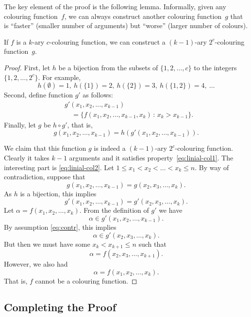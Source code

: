 The key element of the proof is the following lemma. Informally, given any colouring function~$f$, we can always construct another colouring function~$g$ that is ``faster'' (smaller number of arguments) but ``worse'' (larger number of colours).

\begin{lemma}\label{lem:linial-iter}
    If $f$ is a $k$-ary $c$-colouring function, we can construct a $(k-1)$-ary $2^c$-colouring function~$g$.
\end{lemma}
\begin{proof}
    First, let $h$ be a bijection from the subsets of $\{1,2,\dotsc,c\}$ to the integers $\{1,2,\dotsc,2^c\}$. For example,
    \[
        h(\emptyset) = 1,\ h(\{1\}) = 2,\ h(\{2\}) = 3,\ h(\{1,2\}) = 4,\ \dotsc
    \]
    Second, define function $g'$ as follows:
    \[
    \begin{split}
        &g'(x_1, x_2, \dotsc, x_{k-1}) \\
        &\quad= \bigl\{ f(x_1, x_2, \dotsc, x_{k-1}, x_k) \,:\, x_k > x_{k-1} \bigr\}.
    \end{split}
    \]
    Finally, let $g$ be $h \circ g'$, that is,
    \[
        g(x_1, x_2, \dotsc, x_{k-1}) = h(g'(x_1, x_2, \dotsc, x_{k-1})).
    \]

    We claim that this function $g$ is indeed a $(k-1)$-ary $2^c$-colouring function. Clearly it takes $k-1$ arguments and it satisfies property~\eqref{eq:linial-col1}. The interesting part is \eqref{eq:linial-col2}. Let $1 \le x_1 < x_2 < \dotso < x_k \le n$. By way of contradiction, suppose that
    \[
        g(x_1, x_2, \dotsc, x_{k-1}) = g(x_2, x_3, \dotsc, x_k).
    \]
    As $h$ is a bijection, this implies
    \begin{equation}
        g'(x_1, x_2, \dotsc, x_{k-1}) = g'(x_2, x_3, \dotsc, x_k). \label{eq:contr}
    \end{equation}
    Let $\alpha = f(x_1, x_2, \dotsc, x_k)$.
    From the definition of $g'$ we have
    \[
        \alpha \in g'(x_1, x_2, \dotsc, x_{k-1}).
    \]
    By assumption \eqref{eq:contr}, this implies
    \[
        \alpha \in g'(x_2, x_3, \dotsc, x_k).
    \]
    But then we must have some $x_k < x_{k+1} \le n$ such that
    \[
        \alpha = f(x_2, x_3, \dotsc, x_{k+1}).
    \]
    However, we also had
    \[
        \alpha = f(x_1, x_2, \dotsc, x_k).
    \]
    That is, $f$ cannot be a colouring function.
\end{proof}


\subsection{Completing the Proof}

